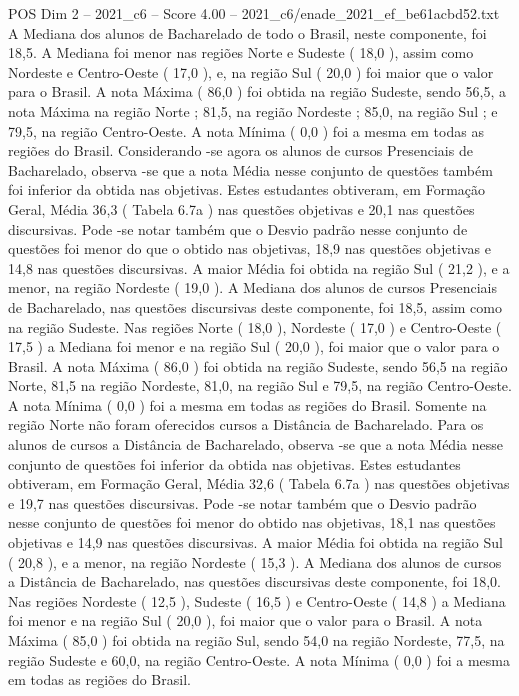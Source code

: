 \begin{textsample}{POS Dim 2 – 2021\_c6 – Score 4.00 – 2021\_c6/enade\_2021\_ef\_be61acbd52.txt}
A Mediana dos alunos de Bacharelado de todo o Brasil, neste componente, foi 18,5.
A Mediana foi menor nas regiões Norte e Sudeste ( 18,0 ), assim como Nordeste e Centro-Oeste ( 17,0 ), e, na região Sul ( 20,0 ) foi maior que o valor para o Brasil.
A nota Máxima ( 86,0 ) foi obtida na região Sudeste, sendo 56,5, a nota Máxima na região Norte ; 81,5, na região Nordeste ; 85,0, na região Sul ; e 79,5, na região Centro-Oeste.
A nota Mínima ( 0,0 ) foi a mesma em todas as regiões do Brasil.
Considerando -se agora os alunos de cursos Presenciais de Bacharelado, observa -se que a nota Média nesse conjunto de questões também foi inferior da obtida nas objetivas.
Estes estudantes obtiveram, em Formação Geral, Média 36,3 ( Tabela 6.7a ) nas questões objetivas e 20,1 nas questões discursivas.
Pode -se notar também que o Desvio padrão nesse conjunto de questões foi menor do que o obtido nas objetivas, 18,9 nas questões objetivas e 14,8 nas questões discursivas.
A maior Média foi obtida na região Sul ( 21,2 ), e a menor, na região Nordeste ( 19,0 ).
A Mediana dos alunos de cursos Presenciais de Bacharelado, nas questões discursivas deste componente, foi 18,5, assim como na região Sudeste.
Nas regiões Norte ( 18,0 ), Nordeste ( 17,0 ) e Centro-Oeste ( 17,5 ) a Mediana foi menor e na região Sul ( 20,0 ), foi maior que o valor para o Brasil.
A nota Máxima ( 86,0 ) foi obtida na região Sudeste, sendo 56,5 na região Norte, 81,5 na região Nordeste, 81,0, na região Sul e 79,5, na região Centro-Oeste.
A nota Mínima ( 0,0 ) foi a mesma em todas as regiões do Brasil.
Somente na região Norte não foram oferecidos cursos a Distância de Bacharelado.
Para os alunos de cursos a Distância de Bacharelado, observa -se que a nota Média nesse conjunto de questões foi inferior da obtida nas objetivas.
Estes estudantes obtiveram, em Formação Geral, Média 32,6 ( Tabela 6.7a ) nas questões objetivas e 19,7 nas questões discursivas.
Pode -se notar também que o Desvio padrão nesse conjunto de questões foi menor do obtido nas objetivas, 18,1 nas questões objetivas e 14,9 nas questões discursivas.
A maior Média foi obtida na região Sul ( 20,8 ), e a menor, na região Nordeste ( 15,3 ).
A Mediana dos alunos de cursos a Distância de Bacharelado, nas questões discursivas deste componente, foi 18,0.
Nas regiões Nordeste ( 12,5 ), Sudeste ( 16,5 ) e Centro-Oeste ( 14,8 ) a Mediana foi menor e na região Sul ( 20,0 ), foi maior que o valor para o Brasil.
A nota Máxima ( 85,0 ) foi obtida na região Sul, sendo 54,0 na região Nordeste, 77,5, na região Sudeste e 60,0, na região Centro-Oeste.
A nota Mínima ( 0,0 ) foi a mesma em todas as regiões do Brasil.

\end{textsample}
